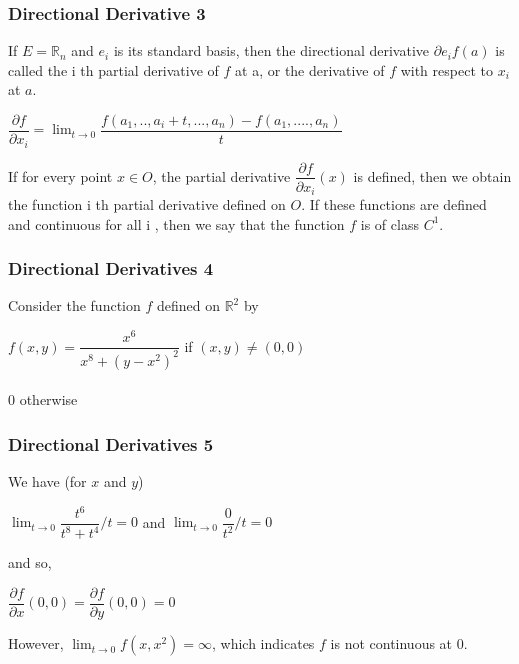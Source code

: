 \documentclass{beamer}
\newcommand{\R}{\mathbb{R}}
\begin{document}
\begin{frame}
\frametitle{Directional Derivative 3}

If $E = \R_{n}$ and $e_{i}$ is its standard basis, then the directional derivative $\partial{e_{i}}f(a)$ is called the i th partial derivative of $f$ at a, or the derivative of $f$ with respect to $x_{i}$ at $a$.

\pause
\begin{center}
$\dfrac{\partial f}{\partial{x_{i}}} = \lim_{t \to 0} \dfrac{f(a_{1},..,a_{i} + t,...,a_{n}) - f(a_{1},....,a_{n})}{t}$
\end{center}

\pause

If for every point $x \in O$, the partial derivative $\dfrac{\partial f}{\partial x_{i}} (x) $ is defined, then we obtain the function i th partial derivative defined on $O$. If these functions are defined and continuous for all i , then we say that the function $f$ is of class $ C^{1} $.


\end{frame}
\begin{frame}
\frametitle{Directional Derivatives 4}
\begin{small}
\begin{example}[2]
Consider the function $f$ defined on $ \R^{2} $ by

\begin{center}
$f(x, y) = \dfrac{x^6}{ x^8 + (y-x^2)^2 }$	 if $(x,y) \neq (0,0)$ \\~\\
 0 otherwise
\end{center}

\end{example}
\end{small}
\end{frame}



\begin{frame}
\frametitle{Directional Derivatives 5}
\begin{small}
\begin{example}[2]
We have (for $x$ and $y$)
\begin{center}
$\lim_{t \to 0}\dfrac{t^{6}}{t^8 + t^4}/t = 0$ and  $\lim_{t \to 0}\dfrac{0}{t^2}/t = 0$
\end{center}

and so,
\begin{center}
$ \dfrac{\partial f}{\partial x}(0,0) = \dfrac{\partial f}{\partial y}(0,0) = 0$
\end{center}

However, $\lim_{t \to 0}f(x,x^2) = \infty $, which indicates $f$ is not continuous at 0.

\end{example}
\end{small}
\end{frame}
\end{document}
